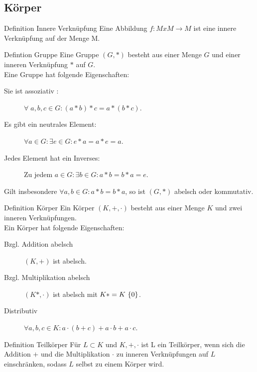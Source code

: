 \documentclass[a6paper,11pt,print,grid=front]{kartei/kartei}
\begin{document}
\subsection*{Körper}
\begin{karte}{Definition Innere Verknüpfung}
    Eine Abbildung \(f: M x M \rightarrow M\) 
    ist eine innere Verknüpfung auf der Menge M.
\end{karte}
\begin{karte}{Defintion Gruppe}
    Eine Gruppe \( (G,*) \) besteht aus einer Menge 
    \(G\) und einer inneren Verknüpfung \(*\) auf \(G\).\\
    Eine Gruppe hat folgende Eigenschaften: 
    \begin{description}
        \item[Sie ist assoziativ :] \(\forall \; a,b,c \in G : (a * b) * c = a * (b * c)\).
        \item[Es gibt ein neutrales Element:] \(\forall a \in G : \exists e \in G : e*a = a*e = a\).
        \item[Jedes Element hat ein Inverses:] Zu jedem \(a \in G : \exists b \in G : a * b = b * a = e\). 
    \end{description}
    Gilt insbesondere \(\forall a,b \in G : a * b = b * a \), so ist 
    \((G,*)\) abelsch oder kommutativ. 
\end{karte}
\begin{karte}{Definition Körper}
    Ein Körper \((K,+,\cdot)\) besteht aus einer Menge \(K\) und zwei 
    inneren Verknüpfungen. \\
    Ein Körper hat folgende Eigenschaften: 
    \begin{description}
        \item[Bzgl. Addition abelsch]\((K,+)\) ist abelsch.
        \item[Bzgl. Multiplikation abelsch]\((K*,\cdot)\) ist abelsch mit \(K* = K \ \{0\}\).
        \item[Distributiv]\(\forall a,b,c \in K : a \cdot (b + c) + a \cdot b + a \cdot c\).   
    \end{description}
\end{karte}
\begin{karte}{Definition Teilkörper}
    Für \(L \subset K\) und \(K,+,\cdot\) ist L ein Teilkörper, 
    wenn sich die Addition \(+\) und die Multiplikation \(\cdot\) 
    zu inneren Verknüpfungen auf \(L\) einschränken, sodass \(L\)
    selbst zu einem Körper wird.
\end{karte}
\end{document}
